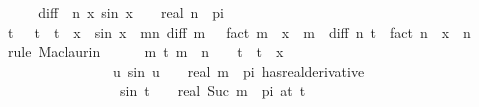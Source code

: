 \begin{isabellebody}
%
\isadelimproof
%
\endisadelimproof
%
\isatagproof
{}\isamarkupfalse%
\ {\isacharminus}{\kern0pt}\isanewline
\ \ \isamarkupfalse%
\ {\isacharquery}{\kern0pt}diff\ {\isacharequal}{\kern0pt}\ {\isachardoublequoteopen}{\isasymlambda}n\ x{\isachardot}{\kern0pt}\ sin\ {\isacharparenleft}{\kern0pt}x\ {\isacharplus}{\kern0pt}\ {}{\isacharslash}{\kern0pt}{}\ {\isacharasterisk}{\kern0pt}\ real\ n\ {\isacharasterisk}{\kern0pt}\ pi{\isacharparenright}{\kern0pt}{\isachardoublequoteclose}\isanewline
\ \ \isamarkupfalse%
\ {\isachardoublequoteopen}{\isasymexists}t{\isachardot}{\kern0pt}\ {}\ {\isacharless}{\kern0pt}\ t\ {\isasymand}\ t\ {\isasymle}\ x\ {\isasymand}\ sin\ x\ {\isacharequal}{\kern0pt}\ {\isacharparenleft}{\kern0pt}{\isasymSum}m{\isacharless}{\kern0pt}n{\isachardot}{\kern0pt}\ {\isacharquery}{\kern0pt}diff\ m\ {}\ {\isacharslash}{\kern0pt}\ {\isacharparenleft}{\kern0pt}fact\ m{\isacharparenright}{\kern0pt}\ {\isacharasterisk}{\kern0pt}\ x\ {\isacharcircum}{\kern0pt}\ m{\isacharparenright}{\kern0pt}\ {\isacharplus}{\kern0pt}\ {\isacharquery}{\kern0pt}diff\ n\ t\ {\isacharslash}{\kern0pt}\ fact\ n\ {\isacharasterisk}{\kern0pt}\ x\ {\isacharcircum}{\kern0pt}\ n{\isachardoublequoteclose}\isanewline
\ \ \isamarkupfalse%
\ {\isacharparenleft}{\kern0pt}rule\ Maclaurin{}{\isacharparenright}{\kern0pt}\isanewline
\ \ \ \ \isamarkupfalse%
\ {\isachardoublequoteopen}{\isasymforall}m\ t{\isachardot}{\kern0pt}\ m\ {\isacharless}{\kern0pt}\ n\ {\isasymand}\ {}\ {\isasymle}\ t\ {\isasymand}\ t\ {\isasymle}\ x\ {\isasymlongrightarrow}\isanewline
\ \ \ \ \ \ \ \ \ \ \ \ \ \ \ \ {\isacharparenleft}{\kern0pt}{\isacharparenleft}{\kern0pt}{\isasymlambda}u{\isachardot}{\kern0pt}\ sin\ {\isacharparenleft}{\kern0pt}u\ {\isacharplus}{\kern0pt}\ {}{\isacharslash}{\kern0pt}{}\ {\isacharasterisk}{\kern0pt}\ real\ m\ {\isacharasterisk}{\kern0pt}\ pi{\isacharparenright}{\kern0pt}{\isacharparenright}{\kern0pt}\ has{\isacharunderscore}{\kern0pt}real{\isacharunderscore}{\kern0pt}derivative\isanewline
\ \ \ \ \ \ \ \ \ \ \ \ \ \ \ \ \ sin\ {\isacharparenleft}{\kern0pt}t\ {\isacharplus}{\kern0pt}\ {}{\isacharslash}{\kern0pt}{}\ {\isacharasterisk}{\kern0pt}\ real\ {\isacharparenleft}{\kern0pt}Suc\ m{\isacharparenright}{\kern0pt}\ {\isacharasterisk}{\kern0pt}\ pi{\isacharparenright}{\kern0pt}{\isacharparenright}{\kern0pt}\ {\isacharparenleft}{\kern0pt}at\ t{\isacharparenright}{\kern0pt}{\isachardoublequoteclose}\isanewline

\end{isabellebody}
